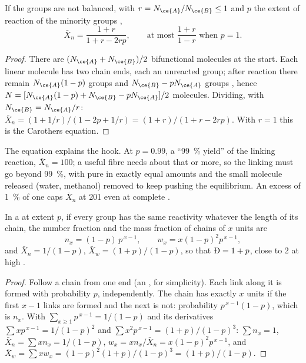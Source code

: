 \begin{corollary}[Imbalance]\label{cor:b2:polymer-synthesis:imbalance}
If the groups are not balanced, with $r = N_{\ce{A}}/N_{\ce{B}} \le 1$ and $p$ the extent of reaction of
the minority groups ,
\begin{equation*}
\bar X_n = \frac{1 + r}{1 + r - 2rp}, \qquad \text{at most } \frac{1+r}{1-r} \text{ when } p = 1.
\end{equation*}
\end{corollary}

\begin{proof}
There are $(N_{\ce{A}} + N_{\ce{B}})/2$ bifunctional  molecules at the start. Each linear
molecule has two chain ends, each an unreacted group; after reaction there remain $N_{\ce{A}}(1-p)$
groups  and $N_{\ce{B}} - pN_{\ce{A}}$ groups , hence $N = [N_{\ce{A}}(1-p) + N_{\ce{B}} -
pN_{\ce{A}}]/2$ molecules. Dividing, with $N_{\ce{B}} = N_{\ce{A}}/r$:
$\bar X_n = (1 + 1/r)/(1 - 2p + 1/r) = (1+r)/(1 + r - 2rp)$. With $r = 1$ this is the Carothers equation.
\end{proof}

The equation explains the hook. At $p = 0.99$, a ``99~\% yield'' of the linking reaction, $\bar X_n =
100$; a useful fibre needs about that or more, so the linking must go beyond 99~\%, with pure 
in exactly equal amounts and the small molecule released (water, methanol) removed to keep pushing the
equilibrium. An excess of 1~\% of one  caps $\bar X_n$ at 201 even at complete .

\begin{theorem}\label{thm:b2:polymer-synthesis:flory}
In a  at extent $p$, if every group has the same reactivity whatever the
length of its chain, the number fraction and the mass fraction of chains of $x$ units are
\begin{equation*}
n_x = (1-p)\,p^{\,x-1}, \qquad w_x = x(1-p)^2 p^{\,x-1},
\end{equation*}
and $\bar X_n = 1/(1-p)$, $\bar X_w = (1+p)/(1-p)$, so that $\text{\DH} = 1 + p$, close to 2 at high
.
\end{theorem}

\begin{proof}
Follow a chain from one end (an  , for simplicity). Each link along it is formed with
probability $p$, independently. The chain has exactly $x$ units if the first $x-1$ links are formed
and the next is not: probability $p^{\,x-1}(1-p)$, which is $n_x$. With $\sum_{x\ge1} p^{\,x-1} =
1/(1-p)$ and its derivatives $\sum x p^{\,x-1} = 1/(1-p)^2$ and $\sum x^2 p^{\,x-1} = (1+p)/(1-p)^3$:
$\sum n_x = 1$, $\bar X_n = \sum x n_x = 1/(1-p)$, $w_x = x n_x/\bar X_n = x(1-p)^2p^{\,x-1}$, and
$\bar X_w = \sum x w_x = (1-p)^2(1+p)/(1-p)^3 = (1+p)/(1-p)$.
\end{proof}

